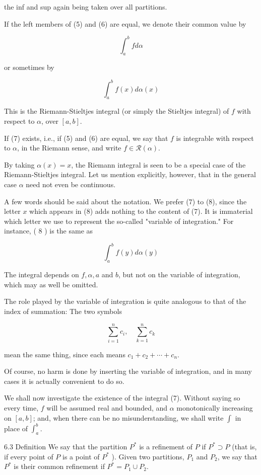 \documentclass[10pt]{article}
\begin{document}
the inf and sup again being taken over all partitions.

If the left members of (5) and (6) are equal, we denote their common value by

$$
\int_{a}^{b} f d \alpha
$$

or sometimes by

$$
\int_{a}^{b} f(x) d \alpha(x)
$$

This is the Riemann-Stieltjes integral (or simply the Stieltjes integral) of $f$ with respect to $\alpha$, over $[a, b]$.

If (7) exists, i.e., if (5) and (6) are equal, we say that $f$ is integrable with respect to $\alpha$, in the Riemann sense, and write $f \in \mathscr{R}(\alpha)$.

By taking $\alpha(x)=x$, the Riemann integral is seen to be a special case of the Riemann-Stieltjes integral. Let us mention explicitly, however, that in the general case $\alpha$ need not even be continuous.

A few words should be said about the notation. We prefer (7) to (8), since the letter $x$ which appears in (8) adds nothing to the content of (7). It is immaterial which letter we use to represent the so-called "variable of integration." For instance, ( 8 ) is the same as

$$
\int_{a}^{b} f(y) d \alpha(y)
$$

The integral depends on $f, \alpha, a$ and $b$, but not on the variable of integration, which may as well be omitted.

The role played by the variable of integration is quite analogous to that of the index of summation: The two symbols

$$
\sum_{i=1}^{n} c_{i}, \quad \sum_{k=1}^{n} c_{k}
$$

mean the same thing, since each means $c_{1}+c_{2}+\cdots+c_{n}$.

Of course, no harm is done by inserting the variable of integration, and in many cases it is actually convenient to do so.

We shall now investigate the existence of the integral (7). Without saying so every time, $f$ will be assumed real and bounded, and $\alpha$ monotonically increasing on $[a, b]$; and, when there can be no misunderstanding, we shall write $\int$ in place of $\int_{a}^{b}$.

6.3 Definition We say that the partition $P^{*}$ is a refinement of $P$ if $P^{*} \supset P$ (that is, if every point of $P$ is a point of $P^{*}$ ). Given two partitions, $P_{1}$ and $P_{2}$, we say that $P^{*}$ is their common refinement if $P^{*}=P_{1} \cup P_{2}$.
\end{document}
